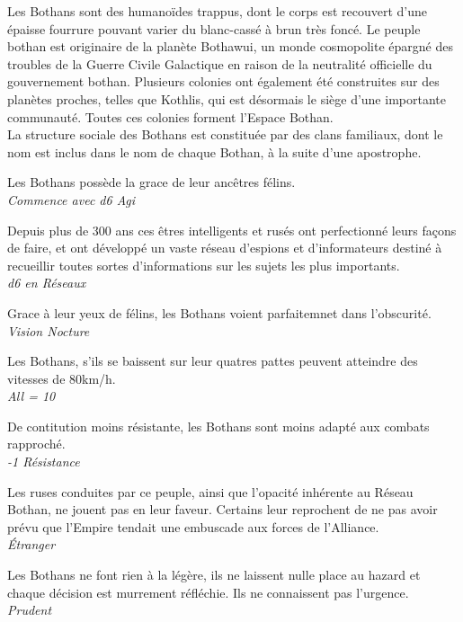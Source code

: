Les Bothans sont des humanoïdes trappus, dont le corps est recouvert d'une épaisse fourrure pouvant varier du blanc-cassé à brun très foncé.
Le peuple bothan est originaire de la planète Bothawui, un monde cosmopolite épargné des troubles de la Guerre Civile Galactique en raison de la neutralité officielle du gouvernement bothan. Plusieurs colonies ont également été construites sur des planètes proches, telles que Kothlis, qui est désormais le siège d'une importante communauté. Toutes ces colonies forment l'Espace Bothan.\\
La structure sociale des Bothans est constituée par des clans familiaux, dont le nom est inclus dans le nom de chaque Bothan, à la suite d'une apostrophe.

\begin{description}[align=left]
\item [Agilité du Félin] 			%
		Les Bothans possède la grace de leur ancêtres félins.\\
		\emph{Commence avec d6 Agi}
\item [Service de renseignement] 	%
		Depuis plus de 300 ans ces êtres intelligents et rusés ont perfectionné leurs façons de faire, et ont développé un vaste réseau d'espions et d'informateurs destiné à recueillir toutes sortes d'informations sur les sujets les plus importants.\\
		\emph{d6 en Réseaux}
\item [Comme en plein jour] 		%
		Grace à leur yeux de félins, les Bothans voient parfaitemnet dans l'obscurité.\\
		\emph{Vision Nocture}
\item [Déplacement rapide] 			%
		Les Bothans, s'ils se baissent sur leur quatres pattes peuvent atteindre des vitesses de 80km/h.\\
		\emph{All = 10}
\item [Frêle] 						%
		De contitution moins résistante, les Bothans sont moins adapté aux combats rapproché.\\
		\emph{-1 Résistance}
\item [Mauvaise réputation] 		%
		Les ruses conduites par ce peuple, ainsi que l'opacité inhérente au Réseau Bothan, ne jouent pas en leur faveur. Certains leur reprochent de ne pas avoir prévu que l'Empire tendait une embuscade aux forces de l'Alliance.\\
		\emph{\'Etranger}
\item [Prudent] 					%
		Les Bothans ne font rien à la légère, ils ne laissent nulle place au hazard et chaque décision est murrement réfléchie. Ils ne connaissent pas l'urgence.\\
		\emph{Prudent}
\end{description}

